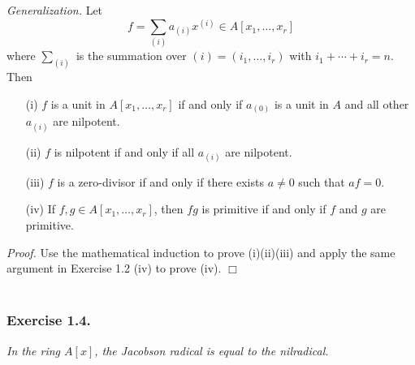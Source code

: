\documentclass{article}
\begin{document}
\emph{Generalization.}
Let
\[
  f = \sum_{(i)} a_{(i)} x^{(i)}\in A[x_1, \ldots, x_r]
\]
where $\sum_{(i)}$ is the summation over $(i) = (i_1, \ldots, i_r)$ with $i_1 + \cdots + i_r = n$.
Then
\begin{enumerate}
\item[(i)]
  $f$ is a unit in $A[x_1, \ldots, x_r]$ if and only if
  $a_{(0)}$ is a unit in $A$ and all other $a_{(i)}$ are nilpotent.

\item[(ii)]
  $f$ is nilpotent if and only if all $a_{(i)}$ are nilpotent.

\item[(iii)]
  $f$ is a zero-divisor if and only if
  there exists $a \neq 0$ such that $af = 0$.

\item[(iv)]
  If $f, g \in A[x_1, \ldots, x_r]$, then $fg$ is primitive if and only if
  $f$ and $g$ are primitive. \\
\end{enumerate}



\emph{Proof.}
  Use the mathematical induction to prove (i)(ii)(iii)
  and apply the same argument in Exercise 1.2 (iv) to prove (iv).
$\Box$ \\\\






\subsubsection*{Exercise 1.4.}
\emph{In the ring $A[x]$, the Jacobson radical is equal to the nilradical.} \\
\end{document}
